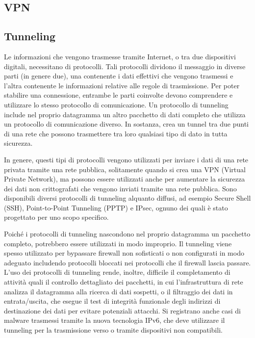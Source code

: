 \subsection{VPN}
\subsection{Tunneling}
Le informazioni che vengono trasmesse tramite Internet, o tra due dispositivi digitali, necessitano di protocolli. Tali protocolli dividono il messaggio in diverse parti (in genere due), una contenente i dati effettivi che vengono trasmessi e l'altra contenente le informazioni relative alle regole di trasmissione. Per poter stabilire una connessione, entrambe le parti coinvolte devono comprendere e utilizzare lo stesso protocollo di comunicazione. Un protocollo di tunneling include nel proprio datagramma un altro pacchetto di dati completo che utilizza un protocollo di comunicazione diverso. In sostanza, crea un tunnel tra due punti di una rete che possono trasmettere tra loro qualsiasi tipo di dato in tutta sicurezza.

In genere, questi tipi di protocolli vengono utilizzati per inviare i dati di una rete privata tramite una rete pubblica, solitamente quando si crea una VPN (Virtual Private Network), ma possono essere utilizzati anche per aumentare la sicurezza dei dati non crittografati che vengono inviati tramite una rete pubblica. Sono disponibili diversi protocolli di tunneling alquanto diffusi, ad esempio Secure Shell (SSH), Point-to-Point Tunneling (PPTP) e IPsec, ognuno dei quali è stato progettato per uno scopo specifico.

Poiché i protocolli di tunneling nascondono nel proprio datagramma un pacchetto completo, potrebbero essere utilizzati in modo improprio. Il tunneling viene spesso utilizzato per bypassare firewall non sofisticati o non configurati in modo adeguato includendo protocolli bloccati nei protocolli che il firewall lascia passare. L'uso dei protocolli di tunneling rende, inoltre, difficile il completamento di attività quali il controllo dettagliato dei pacchetti, in cui l'infrastruttura di rete analizza il datagramma alla ricerca di dati sospetti, o il filtraggio dei dati in entrata/uscita, che esegue il test di integrità funzionale degli indirizzi di destinazione dei dati per evitare potenziali attacchi. Si registrano anche casi di malware trasmessi tramite la nuova tecnologia IPv6, che deve utilizzare il tunneling per la trasmissione verso o tramite dispositivi non compatibili.

